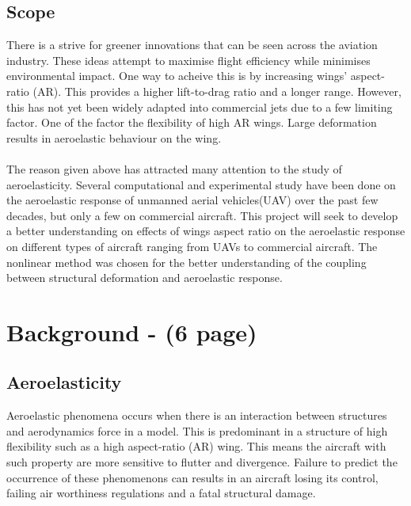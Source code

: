 \documentclass[11pt]{article}
\begin{document}
\subsection{Scope} 
There is a strive for greener innovations that can be seen across the aviation industry. These ideas attempt to maximise flight efficiency while minimises environmental impact. One way to acheive this is by increasing wings' aspect-ratio (AR). This provides a higher lift-to-drag ratio and a longer range. However, this has not yet been widely adapted into commercial jets due to a few limiting factor. One of the factor the flexibility of high AR wings. Large deformation results in aeroelastic behaviour on the wing.\\ \\
The reason given above has attracted many attention to the study of aeroelasticity. Several computational and experimental study have been done on the aeroelastic response of unmanned aerial vehicles(UAV) over the past few decades, but only a few on commercial aircraft. This project will seek to develop a better understanding on effects of wings aspect ratio on the aeroelastic response on different types of aircraft ranging from UAVs to commercial aircraft. The nonlinear method was chosen for the better understanding of the coupling between structural deformation and aeroelastic response. 

\newpage
\section{Background - (6 page)}
\label{sec:background}

\subsection{Aeroelasticity}
Aeroelastic phenomena occurs when there is an interaction between structures and aerodynamics force in a model. This is predominant in a structure of high flexibility such as a high aspect-ratio (AR) wing. This means the aircraft with such property are more sensitive to flutter and divergence. Failure to predict the occurrence of these phenomenons can results in an aircraft losing its control, failing air worthiness regulations and a fatal structural damage.\\
\end{document}
